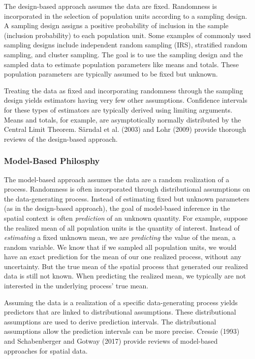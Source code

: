 \documentclass[]{elsarticle} %
\begin{document}
The design-based approach assumes the data are fixed. Randomness is
incorporated in the selection of population units according to a
sampling design. A sampling design assigns a positive probability of
inclusion in the sample (inclusion probability) to each population unit.
Some examples of commonly used sampling designs include independent
random sampling (IRS), stratified random sampling, and cluster sampling.
The goal is to use the sampling design and the sampled data to estimate
population parameters like means and totals. These population parameters
are typically assumed to be fixed but unknown.

Treating the data as fixed and incorporating randomness through the
sampling design yields estimators having very few other assumptions.
Confidence intervals for these types of estimators are typically derived
using limiting arguments. Means and totals, for example, are
asymptotically normally distributed by the Central Limit Theorem.
Särndal et al. (2003) and Lohr (2009) provide thorough reviews of the
design-based approach.

\hypertarget{model-based-philosphy}{%
\subsubsection{Model-Based Philosphy}\label{model-based-philosphy}}

The model-based approach assumes the data are a random realization of a
process. Randomness is often incorporated through distributional
assumptions on the data-generating process. Instead of estimating fixed
but unknown parameters (as in the design-based approach), the goal of
model-based inference in the spatial context is often \emph{prediction}
of an unknown quantity. For example, suppose the realized mean of all
population units is the quantity of interest. Instead of
\emph{estimating} a fixed unknown mean, we are \emph{predicting} the
value of the mean, a random variable. We know that if we sampled all
population units, we would have an exact prediction for the mean of our
one realized process, without any uncertainty. But the true mean of the
spatial process that generated our realized data is still not known.
When predicting the realized mean, we typically are not interested in
the underlying process' true mean.

Assuming the data is a realization of a specific data-generating process
yields predictors that are linked to distributional assumptions. These
distributional assumptions are used to derive prediction intervals. The
distributional assumptions allow the prediction intervals can be more
precise. Cressie (1993) and Schabenberger and Gotway (2017) provide
reviews of model-based approaches for spatial data.
\end{document}
